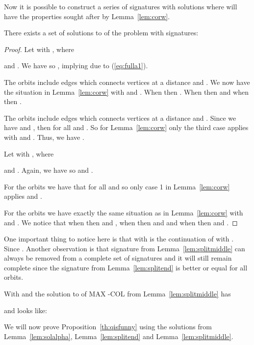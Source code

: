 \documentclass[11pt,a4paper]{article}
\begin{document}
Now it is possible to construct a series of signatures with solutions  where  will have the properties sought after by Lemma~\ref{lem:corw}.

\begin{lemma}
\label{lem:splitmiddle}
There exists a set of solutions  to  of the problem  with signatures:

\end{lemma}
\begin{proof}
Let  with ,
where

and
.
We have  so , implying  due to (\ref{eq:fulla1}).

The orbits  include edges which connects vertices at a distance  and
. We now have the situation in Lemma~\ref{lem:corw} with  and . When  then . When  then  and when  then .

The orbits  include edges which connects vertices at a distance  and 
. Since we have  and , then  for all  and . So for Lemma~\ref{lem:corw} only the third case applies with  and . Thus, we have .

Let  with 
, where

and
.
Again, we have  so  and .

For the orbits  we have that  for all  and  so only case 1 in Lemma~\ref{lem:corw} applies and .

For the orbits  we have exactly the same situation as in Lemma~\ref{lem:corw} with  and . We notice that when  then  and  , when  then  and  and when  then  and .
\end{proof}

One important thing to notice here is that  with  is the continuation of  with . Since . Another observation is that signature  from Lemma~\ref{lem:splitmiddle} can always be removed from a complete set of signatures and it will still remain complete since the signature from Lemma~\ref{lem:splitend} is better or equal for all orbits. 

\begin{exmp}
With  and  the solution  to  of {\sc MAX -COL} from Lemma~\ref{lem:splitmiddle} has

and looks like:

\end{exmp}







\noindent
We will now prove Proposition~\ref{th:qisfunny} using the solutions from
Lemma~\ref{lem:solalpha}, Lemma~\ref{lem:splitend} and Lemma~\ref{lem:splitmiddle}.
\end{document}
